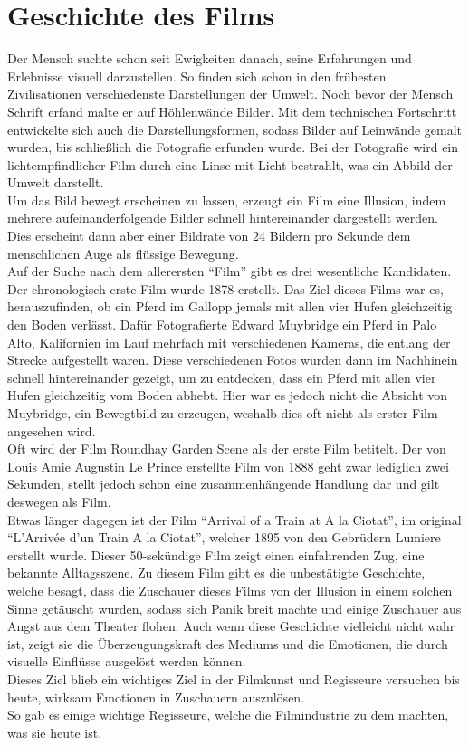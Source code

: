 \section{Geschichte des Films}
Der Mensch suchte schon seit Ewigkeiten danach, seine Erfahrungen und Erlebnisse visuell darzustellen. So finden sich schon in den frühesten Zivilisationen verschiedenste Darstellungen der Umwelt. Noch bevor der Mensch Schrift erfand malte er auf Höhlenwände Bilder. Mit dem technischen Fortschritt entwickelte sich auch die Darstellungsformen, sodass Bilder auf Leinwände gemalt wurden, bis schließlich die Fotografie erfunden wurde. Bei der Fotografie wird ein lichtempfindlicher Film durch eine Linse mit Licht bestrahlt, was ein Abbild der Umwelt darstellt.\\
Um das Bild bewegt erscheinen zu lassen, erzeugt ein Film eine Illusion, indem mehrere aufeinanderfolgende Bilder schnell hintereinander dargestellt werden. Dies erscheint dann aber einer Bildrate von 24 Bildern pro Sekunde dem menschlichen Auge als flüssige Bewegung.\autocite{Schmidt.2013}\\
Auf der Suche nach dem allerersten \enquote{Film} gibt es drei wesentliche Kandidaten.\autocite{HeadsUp.} Der chronologisch erste Film wurde 1878 erstellt.\autocite{Muybridge.1878} Das Ziel dieses Films war es, herauszufinden, ob ein Pferd im Gallopp jemals mit allen vier Hufen gleichzeitig den Boden verlässt. Dafür Fotografierte Edward Muybridge ein Pferd in Palo Alto, Kalifornien im Lauf mehrfach mit verschiedenen Kameras, die entlang der Strecke aufgestellt waren. Diese verschiedenen Fotos wurden dann im Nachhinein schnell hintereinander gezeigt, um zu entdecken, dass ein Pferd mit allen vier Hufen gleichzeitig vom Boden abhebt. Hier war es jedoch nicht die Absicht von Muybridge, ein Bewegtbild zu erzeugen, weshalb dies oft nicht als erster Film angesehen wird.\\
Oft wird der Film Roundhay Garden Scene als der erste Film betitelt.\autocite{LePrince.1888} Der von Louis Amie Augustin Le Prince erstellte Film von 1888 geht zwar lediglich zwei Sekunden, stellt jedoch schon eine zusammenhängende Handlung dar und gilt deswegen als Film.\\
Etwas länger dagegen ist der Film \enquote{Arrival of a Train at A la Ciotat}, im original \enquote{L'Arrivée d'un Train A la Ciotat}, welcher 1895 von den Gebrüdern Lumiere erstellt wurde.\autocite{Lumiere.1895} Dieser 50-sekündige Film zeigt einen einfahrenden Zug, eine bekannte Alltagsszene. Zu diesem Film gibt es die unbestätigte Geschichte, welche besagt, dass die Zuschauer dieses Films von der Illusion in einem solchen Sinne getäuscht wurden, sodass sich Panik breit machte und einige Zuschauer aus Angst aus dem Theater flohen. Auch wenn diese Geschichte vielleicht nicht wahr ist, zeigt sie die Überzeugungskraft des Mediums und die Emotionen, die durch visuelle Einflüsse ausgelöst werden können.\\
Dieses Ziel blieb ein wichtiges Ziel in der Filmkunst und Regisseure versuchen bis heute, wirksam Emotionen in Zuschauern auszulösen.\\
So gab es einige wichtige Regisseure, welche die Filmindustrie zu dem machten, was sie heute ist.
